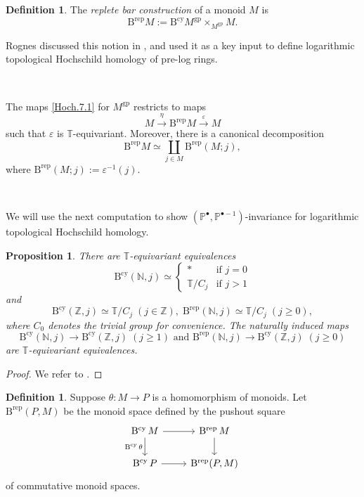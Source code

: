 \documentclass[11pt, a4paper]{amsart}
\newtheorem{prop}[thm]{Proposition}
\theoremstyle{definition}
\newtheorem{df}[thm]{Definition}
\numberwithin{equation}{subsection}
\newcommand{\N}{\mathbb{N}}
\newcommand{\Z}{\mathbb{Z}}
\renewcommand{\P}{\mathbb{P}}
\newcommand{\T}{\mathbb{T}}
\newcommand{\Brep}{\operatorname{B^{rep}}}
\newcommand{\Bcy}{\operatorname{B^{cy}}}
\newcommand{\gp}{{\mathrm{gp}}}
\renewcommand{\epsilon}{\varepsilon}
\begin{document}
\begin{df}
\label{Hoch.8}
The \emph{replete bar construction} of a monoid $M$ is 
\index[notation]{Brep @ $\Brep M$}
\begin{equation}
\label{Hoch.8.3}
\Brep M
:=
\Bcy M^{\gp}\times_{M^{\gp}} M.
\end{equation}
\end{df}

Rognes discussed this notion in \cite[Definition 3.16]{RognesLogHH}, 
and used it as a key input to define logarithmic topological Hochschild homology of pre-log rings.

\ 

The maps \eqref{Hoch.7.1} for $M^{\gp}$ restricts to maps
\begin{equation}
\label{Hoch.8.1}
M
\xrightarrow{\eta}
\Brep M
\xrightarrow{\epsilon}
M
\end{equation}
such that $\epsilon$ is $\T$-equivariant.
Moreover, 
there is a canonical decomposition
\begin{equation}
\label{Hoch.8.2}
\Brep M
\simeq
\coprod_{j\in M}\Brep (M;j),
\end{equation}
where $\Brep (M;j) := \epsilon^{-1}(j)$.

\

We will use the next computation to show $(\P^{\bullet},\P^{\bullet-1})$-invariance for logarithmic 
topological Hochschild homology.

\begin{prop}
\label{Hoch.9}
There are $\mathbb{T}$-equivariant equivalences
\[
\Bcy (\N,j)
\simeq
\left\{
\begin{array}{ll}
* & \text{if }j=0
\\
\mathbb{T}/C_j & \text{if }j>1
\end{array}
\right.
\]
and
\[
\Bcy (\Z,j)
\simeq
\mathbb{T}/C_j
\;
(j\in \Z),
\;
\Brep(\N,j)
\simeq
\mathbb{T}/C_j
\;
(j\geq 0),
\]
where $C_0$ denotes the trivial group for convenience.
The naturally induced maps
\[
\Bcy (\N,j)
\to
\Bcy(\Z,j)
\;
(j\geq 1)
\text{ and }
\Brep (\N,j)
\to
\Bcy(\Z,j)
\;
(j\geq 0)
\]
are $\mathbb{T}$-equivariant equivalences.
\end{prop}
\begin{proof}
We refer to \cite[Propositions 3.20, 3.21]{RognesLogHH}.
\end{proof}


\begin{df}
\label{Hoch.5}
Suppose $\theta\colon M\to P$ is a homomorphism of monoids.
Let $\Brep(P,M)$\index[notation]{BrepPM @ $\Brep(P,M)$} be the monoid space defined by the 
pushout square
\[
\begin{tikzcd}
\Bcy M\ar[r]\ar[d,"\Bcy \theta"']&
\Brep M\ar[d]
\\
\Bcy P\ar[r]&
\Brep (P,M)
\end{tikzcd}
\] 
of commutative monoid spaces.
\end{df}
\end{document}
